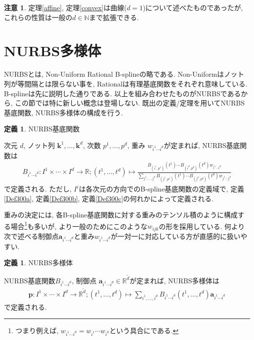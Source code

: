 \documentclass{jsarticle}
\newcommand\setN{\mathbb{N}}
\newcommand\setR{\mathbb{R}}
\theoremstyle{definition}%
\newtheorem{defn}[thm]{定義}
\newtheorem*{rem}{注意}
\newcommand\UC{\textcolor{red}{(執筆中です)}}
\begin{document}
\begin{rem}
    定理\ref{affine}, 定理\ref{convex}は曲線($d=1$)について述べたものであったが, これらの性質は一般の$d\in \setN$まで拡張できる.
\end{rem}





%
%
%
%
%


\newpage
\section{NURBS多様体}
NURBSとは, Non-Uniform Rational B-splineの略である.
Non-Uniformはノット列が等間隔とは限らない事を, Rationalは有理基底関数をそれぞれ意味している.
B-splineは先に説明した通りである.
以上を組み合わせたものがNURBSであるから, この節では特に新しい概念は登場しない.
既出の定義/定理を用いてNURBS基底関数, NURBS多様体の構成を行う.

\begin{screen}
	\begin{defn}
        NURBS基底関数

        次元 $d$, ノット列 $\bm{k}^1,\dots,\bm{k}^d$, 次数 $p^1,\dots,p^d$, 重み $w_{i^1\cdots i^d}$が定まれば, NURBS基底関数は
		\begin{align}
            B_{i^1\cdots i^d}:I^1\times\cdots\times I^d\to\setR;
            (t^1,\dots,t^d)\mapsto\frac{B_{(i^1,p^1)}(t^1)\cdots B_{(i^d,p^d)}(t^d)w_{i^1\cdots i^d}}{\sum\limits_{j^1,\dots,j^d}B_{(j^1,p^1)}(t^1)\cdots B_{(j^d,p^d)}(t^d)w_{j^1\cdots j^d}}
		\end{align}
		で定義される.
        ただし, $I^i$は各次元の方向でのB-spline基底関数の定義域で, 定義\ref{Def300a}, 定義\ref{Def300b}, 定義\ref{Def300c}の何れかによって定義される.
	\end{defn}
\end{screen}
重みの決定には, 各B-spline基底関数に対する重みのテンソル積のように構成する場合\footnote{つまり例えば, $w_{i^1\cdots i^d}=w_{i^1}\cdots w_{i^d}$という具合にである.}も多いが, より一般のためにこのような$w_{ijk}$の形を採用している.
何より次で述べる制御点$\bm{a}_{i^1\cdots i^d}$と重み$w_{i^1\cdots i^d}$が一対一に対応している方が直感的に扱いやすい.

\begin{screen}
	\begin{defn}
        NURBS多様体

        NURBS基底関数$B_{i^1\cdots i^d}$, 制御点 $\bm{a}_{i^1\cdots i^d}\in\setR^{\tilde{d}}$が定まれば, NURBS多様体は
		\begin{align}
            \bm{p}:I^1\times\cdots\times I^d\to\setR^{\tilde{d}};
            (t^1,\dots,t^d)\mapsto\sum_{i^1,\dots,i^d} B_{i^1\cdots i^d}(t^1,\dots,t^d)\bm{a}_{i^1\cdots i^d}
		\end{align}
		で定義される.
	\end{defn}
\end{screen}
\end{document}
